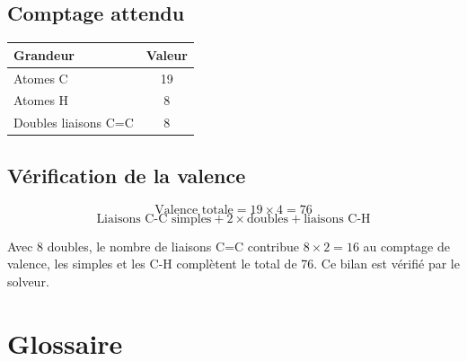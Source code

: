 \documentclass[a4paper,12pt]{article}
\begin{document}
\subsection{Comptage attendu}

\begin{center}
\begin{tabular}{lc}
  \toprule
  Grandeur & Valeur \\
  \midrule
  Atomes C & 19 \\
  Atomes H & 8 \\
  Doubles liaisons C=C & 8 \\
  \bottomrule
\end{tabular}
\end{center}

\subsection{Vérification de la valence}

\[
  \text{Valence totale} = 19 \times 4 = 76
\]
\[
  \text{Liaisons C-C simples} + 2 \times \text{doubles} + \text{liaisons C-H}
\]

Avec 8 doubles, le nombre de liaisons C=C contribue $8 \times 2 = 16$ au comptage de valence,
les simples et les C-H complètent le total de 76. Ce bilan est vérifié par le solveur.

\section{Glossaire}
\end{document}
